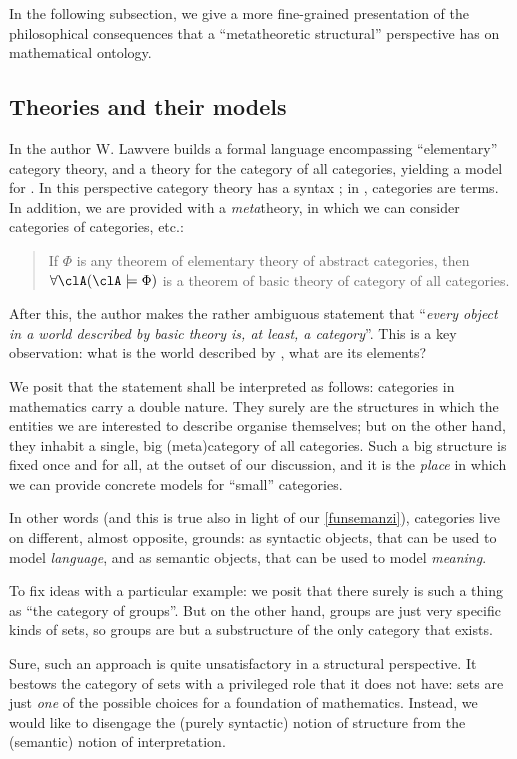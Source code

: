 In the following subsection, we give a more fine-grained presentation of the philosophical consequences that a ``metatheoretic structural'' perspective has on mathematical ontology.
\subsection{Theories and their models}
In \cite{lajolla} the author W. Lawvere builds a formal language  encompassing ``elementary'' category theory, and a theory  for the category of all categories, yielding a model for . In this perspective category theory has a syntax \CT; in \CT, categories are terms. In addition, we are provided with a \emph{meta}theory, in which we can consider categories of categories, etc.:
\begin{quote}
	If $\Phi$ is any theorem of elementary theory of abstract categories, then $\forall \clA (\clA \models \Phi)$ is a theorem of basic theory of category of all categories. \hfill \cite{lajolla}
\end{quote}
After this, the author makes the rather ambiguous statement that ``\textit{every object in a world described by basic theory is, at least, a category}''. This is a key observation: what is the world described by , what are its elements?

We posit that the statement shall be interpreted as follows: categories in mathematics carry a double nature. They surely are the structures in which the entities we are interested to describe organise themselves; but on the other hand, they inhabit a single, big (meta)category of all categories. Such a big structure is fixed once and for all, at the outset of our discussion, and it is the \emph{place} in which we can provide concrete models for ``small'' categories.

In other words (and this is true also in light of our \autoref{funsemanzi}), categories live on different, almost opposite, grounds: as syntactic objects, that can be used to model \emph{language}, and as semantic objects, that can be used to model \emph{meaning}.

To fix ideas with a particular example: we posit that there surely is such a thing as ``the category of groups''. But on the other hand, groups are just very specific kinds of sets, so groups are but a substructure of the only category that exists.

Sure, such an approach is quite unsatisfactory in a structural perspective. It bestows the category of sets with a privileged role that it does not have: sets are just \emph{one} of the possible choices for a foundation of mathematics. Instead, we would like to disengage the (purely syntactic) notion of structure from the (semantic) notion of interpretation.


